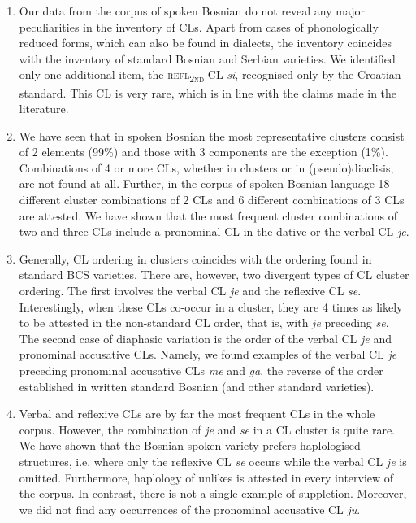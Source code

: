 \begin{enumerate}[label=A\arabic*:]
\item Our data from the corpus of spoken Bosnian do not reveal any major peculiarities in the inventory of CLs. Apart from cases of phonologically reduced forms, which can also be found in dialects, the inventory coincides with the inventory of standard Bosnian and Serbian varieties. We identified only one additional item, the \textsc{refl\textsubscript{2nd}} CL \textit{si}, recognised only by the Croatian standard. This CL is very rare, which is in line with the claims made in the literature.

\item We have seen that in spoken Bosnian the most representative clusters consist of 2 elements (99\%) and those with 3 components are the exception (1\%). Combinations of 4 or more CLs, whether in clusters or in (pseudo)diaclisis, are not found at all. Further, in the corpus of spoken Bosnian language 18 different cluster combinations of 2 CLs and 6 different combinations of 3 CLs are attested. We have shown that the most frequent cluster combinations of two and three CLs include a pronominal CL in the dative or the verbal CL \textit{je}. 

\item Generally, CL ordering in clusters coincides with the ordering found in standard BCS varieties. There are, however, two divergent types of CL cluster ordering. The first involves the verbal CL \textit{je} and the reflexive CL \textit{se}. Interestingly, when these CLs co-occur in a cluster, they are 4 times as likely to be attested in the non-standard CL order, that is, with \textit{je} preceding \textit{se}. The second case of diaphasic variation is the order of the verbal CL \textit{je} and pronominal accusative CLs. Namely, we found examples of the verbal CL \textit{je} preceding pronominal accusative CLs \textit{me} and \textit{ga}, the reverse of the order established in written standard Bosnian (and other standard varieties).

\item Verbal and reflexive CLs are by far the most frequent CLs in the whole corpus. However, the combination of \textit{je} and \textit{se} in a CL cluster is quite rare. We have shown that the Bosnian spoken variety prefers haplologised structures, i.e. where only the reflexive CL \textit{se} occurs while the verbal CL \textit{je} is omitted. Furthermore, haplology of unlikes is attested in every interview of the corpus. In contrast, there is not a single example of suppletion. Moreover, we did not find any occurrences of the pronominal accusative CL \textit{ju}.  


\end{enumerate}
